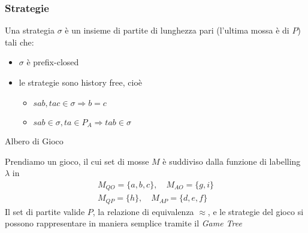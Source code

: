 \documentclass{beamer}
\begin{document}
\begin{frame}

	\frametitle{Strategie}
	
	Una strategia $\sigma$ è un insieme di partite di lunghezza pari (l'ultima mossa è di $P$) tali che:
	\begin{itemize}
		\item $\sigma$ è prefix-closed
		\item le strategie sono history free, cioè
		\begin{itemize}
			\item $sab , tac \in \sigma \Rightarrow b=c$
			\item $sab\in \sigma, ta\in P_A \Rightarrow tab\in \sigma$
		\end{itemize}

	\end{itemize}
	
	\begin{exampleblock}{Albero di Gioco}
 
	Prendiamo un gioco, il cui set di mosse $M$ è suddiviso dalla funzione di labelling $\lambda$ in
	  \begin{gather*}
	      M_{QO}=\{a,b,c\}, \quad  M_{AO}=\{g,i\} \\
	      M_{QP}=\{h\},    \quad  M_{AP}=\{d,e,f\}
          \end{gather*}  
	Il set di partite valide $P$, la relazione di equivalenza $\approx$, e le strategie del gioco si possono rappresentare in maniera semplice tramite il \emph{Game Tree}
	\end{exampleblock}
	
	
\end{frame}

\end{document}
